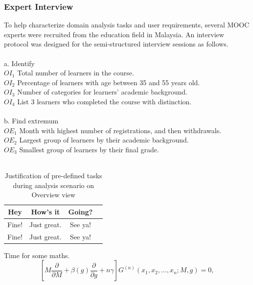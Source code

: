 \subsubsection{Expert Interview}
To help characterize domain analysis tasks and user requirements, several MOOC experts were recruited from the education field in Malaysia. An interview protocol was designed for the semi-structured interview sessions as follows.
\\ \\
a.	Identify \\
\indent $OI_1$ \indent Total number of learners in the course. \\
\indent $OI_2$ \indent Percentage of learners with age between 35 and 55 years old. \\
\indent $OI_3$ \indent Number of categories for learners’ academic background. \\
\indent $OI_4$ \indent List 3 learners who completed the course with distinction.
\\ \\
b.	Find extremum \\
\indent $OE_1$ \indent Month with highest number of registrations, and then withdrawals. \\
\indent $OE_2$ \indent Largest group of learners by their academic background. \\
\indent $OE_3$ \indent Smallest group of learners by their final grade.
\\ \\

\begin{table}[hbt!]
\caption{Justification of pre-defined tasks during analysis scenario on Overview view}
\centering
\begin{tabular}{ |c|c|c|c| }
\hline
Hey & How's it & Going?\\ \hline
Fine! & Just great. & See ya!\\
Fine! & Just great. & See ya!\\
\hline
\end{tabular}

\end{table}

Time for some maths.
\begin{equation}
\left[M\frac{\partial }{\partial M}+\beta(g)\frac{\partial }{\partial g}+n\gamma\right] G^{(n)}(x_1,x_2,\ldots,x_n;M,g)=0,
\end{equation}
